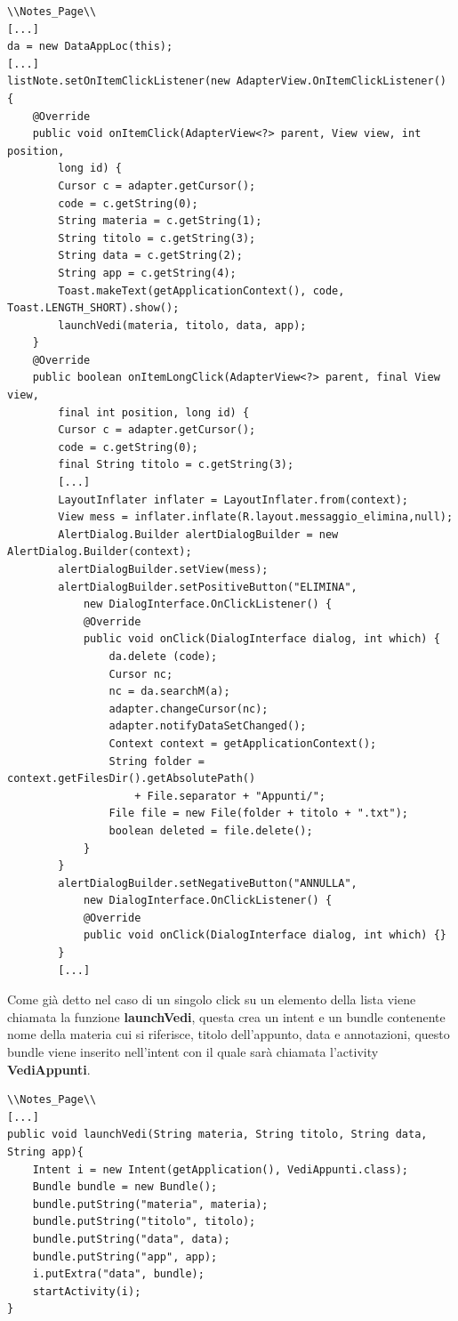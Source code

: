 \documentclass[a4paper, 50pt, twoside]{article}
\begin{document}
\begin{lstlisting}
\\Notes_Page\\
[...]
da = new DataAppLoc(this);
[...]
listNote.setOnItemClickListener(new AdapterView.OnItemClickListener() {
	@Override
	public void onItemClick(AdapterView<?> parent, View view, int position,
		long id) {
		Cursor c = adapter.getCursor();
		code = c.getString(0);
		String materia = c.getString(1);
		String titolo = c.getString(3);
		String data = c.getString(2);
		String app = c.getString(4);
		Toast.makeText(getApplicationContext(), code, Toast.LENGTH_SHORT).show();
		launchVedi(materia, titolo, data, app);
	}
	@Override
	public boolean onItemLongClick(AdapterView<?> parent, final View view,
		final int position, long id) {
		Cursor c = adapter.getCursor();
		code = c.getString(0);
		final String titolo = c.getString(3);
		[...]
		LayoutInflater inflater = LayoutInflater.from(context);
		View mess = inflater.inflate(R.layout.messaggio_elimina,null);
		AlertDialog.Builder alertDialogBuilder = new AlertDialog.Builder(context);
		alertDialogBuilder.setView(mess);
		alertDialogBuilder.setPositiveButton("ELIMINA",
			new DialogInterface.OnClickListener() {
			@Override
			public void onClick(DialogInterface dialog, int which) {
				da.delete (code);
				Cursor nc;
				nc = da.searchM(a);
				adapter.changeCursor(nc);
				adapter.notifyDataSetChanged();
				Context context = getApplicationContext();
				String folder = context.getFilesDir().getAbsolutePath()
					+ File.separator + "Appunti/";
				File file = new File(folder + titolo + ".txt");
				boolean deleted = file.delete();
			}
		}
		alertDialogBuilder.setNegativeButton("ANNULLA",
			new DialogInterface.OnClickListener() {
			@Override
			public void onClick(DialogInterface dialog, int which) {}
		}
		[...]
\end{lstlisting}

Come già detto nel caso di un singolo click su un elemento della lista viene chiamata la funzione \textbf{launchVedi}, questa crea un intent e un bundle contenente nome della materia cui si riferisce, titolo dell'appunto, data e annotazioni, questo bundle viene inserito nell'intent con il quale sarà chiamata l'activity \textbf{VediAppunti}.

\begin{lstlisting}
\\Notes_Page\\
[...]
public void launchVedi(String materia, String titolo, String data, String app){
	Intent i = new Intent(getApplication(), VediAppunti.class);
	Bundle bundle = new Bundle();
	bundle.putString("materia", materia);
	bundle.putString("titolo", titolo);
	bundle.putString("data", data);
	bundle.putString("app", app);
	i.putExtra("data", bundle);
	startActivity(i);
}
\end{lstlisting}
\end{document}
